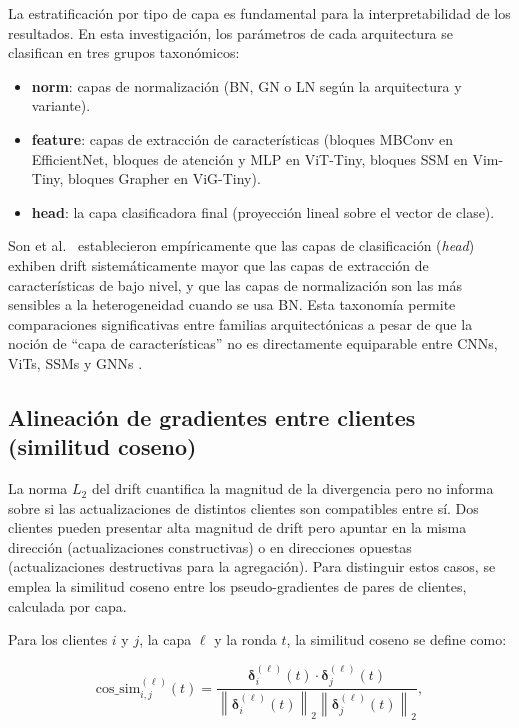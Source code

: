 La estratificación por tipo de capa es fundamental para la interpretabilidad de los resultados.
En esta investigación, los parámetros de cada arquitectura se clasifican en tres grupos
taxonómicos:

\begin{itemize}
  \item \textbf{norm}: capas de normalización (BN, GN o LN según la arquitectura y variante).
  \item \textbf{feature}: capas de extracción de características (bloques MBConv en
    EfficientNet, bloques de atención y MLP en ViT-Tiny, bloques SSM en Vim-Tiny, bloques
    Grapher en ViG-Tiny).
  \item \textbf{head}: la capa clasificadora final (proyección lineal sobre el vector de clase).
\end{itemize}

Son et al.\ \cite{son2022comparisons} establecieron empíricamente que las capas de
clasificación (\textit{head}) exhiben drift sistemáticamente mayor que las capas de extracción
de características de bajo nivel, y que las capas de normalización son las más sensibles a la
heterogeneidad cuando se usa BN. Esta taxonomía permite comparaciones significativas entre
familias arquitectónicas a pesar de que la noción de ``capa de características'' no es
directamente equiparable entre CNNs, ViTs, SSMs y GNNs \cite{son2022comparisons}.

\subsection{Alineación de gradientes entre clientes (similitud coseno)}

La norma $L_2$ del drift cuantifica la magnitud de la divergencia pero no informa sobre si las
actualizaciones de distintos clientes son compatibles entre sí. Dos clientes pueden presentar
alta magnitud de drift pero apuntar en la misma dirección (actualizaciones constructivas) o en
direcciones opuestas (actualizaciones destructivas para la agregación). Para distinguir estos
casos, se emplea la similitud coseno entre los pseudo-gradientes de pares de clientes,
calculada por capa.

Para los clientes $i$ y $j$, la capa $\ell$ y la ronda $t$, la similitud coseno se define como:

\begin{equation}
  \text{cos\_sim}_{i,j}^{(\ell)}(t) =
  \frac{\boldsymbol{\delta}_i^{(\ell)}(t) \cdot \boldsymbol{\delta}_j^{(\ell)}(t)}
  {\left\|\boldsymbol{\delta}_i^{(\ell)}(t)\right\|_2
   \left\|\boldsymbol{\delta}_j^{(\ell)}(t)\right\|_2},
  \label{eq:cossim}
\end{equation}

